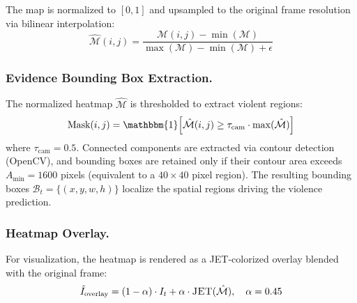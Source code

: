\documentclass[11pt,a4paper]{article}
\begin{document}
The map is normalized to $[0, 1]$ and upsampled to the original frame resolution via bilinear interpolation:
\begin{equation}
\hat{\mathcal{M}}(i,j) = \frac{\mathcal{M}(i,j) - \min(\mathcal{M})}{\max(\mathcal{M}) - \min(\mathcal{M}) + \epsilon}
\end{equation}


\subsubsection{Evidence Bounding Box Extraction.}
The normalized heatmap $\hat{\mathcal{M}}$ is thresholded to extract violent regions:
\begin{equation}
\text{Mask}(i,j) = \mathbbm{1}\!\left[\hat{\mathcal{M}}(i,j) \geq \tau_{\text{cam}} \cdot \max(\hat{\mathcal{M}})\right]
\end{equation}
where $\tau_{\text{cam}} = 0.5$. Connected components are extracted via contour detection (OpenCV), and bounding boxes are retained only if their contour area exceeds $A_{\min} = 1600$ pixels (equivalent to a $40 \times 40$ pixel region). The resulting bounding boxes $\mathcal{B}_t = \{(x, y, w, h)\}$ localize the spatial regions driving the violence prediction.


\subsubsection{Heatmap Overlay.}
For visualization, the heatmap is rendered as a JET-colorized overlay blended with the original frame:
\begin{equation}
\hat{I}_{\text{overlay}} = (1 - \alpha) \cdot I_t + \alpha \cdot \textsc{JET}(\hat{\mathcal{M}}), \quad \alpha = 0.45
\end{equation}
\end{document}
